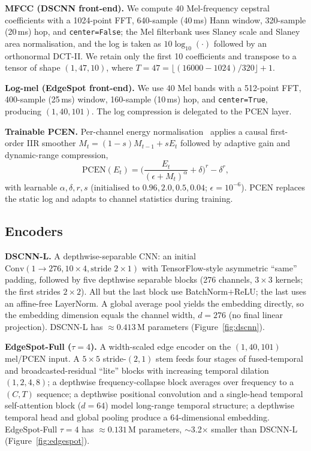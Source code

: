 \documentclass[12pt,a4paper]{article}
\newcommand{\code}[1]{\texttt{\small #1}}
\begin{document}
\textbf{MFCC (DSCNN front-end).} We compute 40 Mel-frequency cepstral
coefficients with a 1024-point FFT, 640-sample (40\,ms) Hann window, 320-sample
(20\,ms) hop, and \code{center=False}; the Mel filterbank uses Slaney scale and
Slaney area normalisation, and the log is taken as $10\log_{10}(\cdot)$ followed
by an orthonormal DCT-II. We retain only the first 10 coefficients and transpose
to a tensor of shape $(1,47,10)$, where $T = 47 =
\lfloor(16000-1024)/320\rfloor + 1$.

\textbf{Log-mel (EdgeSpot front-end).} We use 40 Mel bands with a 512-point FFT,
400-sample (25\,ms) window, 160-sample (10\,ms) hop, and \code{center=True},
producing $(1,40,101)$. The log compression is delegated to the PCEN layer.

\textbf{Trainable PCEN.} Per-channel energy
normalisation~\cite{wang2017trainable} applies a causal first-order IIR smoother
$M_t = (1-s)M_{t-1} + sE_t$ followed by adaptive gain and dynamic-range
compression,
\begin{equation}
\text{PCEN}(E_t)=\Big(\frac{E_t}{(\epsilon+M_t)^{\alpha}}+\delta\Big)^{r}-\delta^{r},
\label{eq:pcen}
\end{equation}
with learnable $\alpha,\delta,r,s$ (initialised to $0.96, 2.0, 0.5, 0.04$;
$\epsilon{=}10^{-6}$). PCEN replaces the static log and adapts to channel
statistics during training.

\subsection{Encoders}\label{sec:encoders}

\textbf{DSCNN-L.} A depthwise-separable CNN: an initial
$\text{Conv}(1{\to}276, 10{\times}4, \text{stride } 2{\times}1)$ with
TensorFlow-style asymmetric ``same'' padding, followed by five depthwise
separable blocks (276 channels, $3{\times}3$ kernels; the first strides
$2{\times}2$). All but the last block use BatchNorm$+$ReLU; the last uses an
affine-free LayerNorm. A global average pool yields the embedding directly, so
the embedding dimension equals the channel width, $d = 276$ (no final linear
projection). DSCNN-L has $\approx 0.413$\,M parameters
(Figure~\ref{fig:dscnn}).

\textbf{EdgeSpot-Full ($\tau{=}4$).} A width-scaled edge encoder on the
$(1,40,101)$ mel/PCEN input. A $5{\times}5$ stride-$(2,1)$ stem feeds four stages
of fused-temporal and broadcasted-residual ``lite'' blocks with increasing
temporal dilation $(1,2,4,8)$; a depthwise frequency-collapse block averages over
frequency to a $(C,T)$ sequence; a depthwise positional convolution and a
single-head temporal self-attention block ($d{=}64$) model long-range temporal
structure; a depthwise temporal head and global pooling produce a 64-dimensional
embedding. EdgeSpot-Full $\tau{=}4$ has $\approx 0.131$\,M parameters,
$\sim$3.2$\times$ smaller than DSCNN-L (Figure~\ref{fig:edgespot}).
\end{document}

